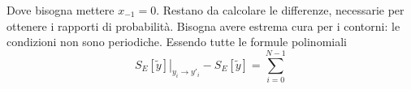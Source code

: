 \documentclass[italian]{article}
\begin{document}
	Dove bisogna mettere $x_{-1} = 0$. Restano da calcolare le differenze, necessarie per ottenere i rapporti di probabilità. Bisogna avere estrema cura per i contorni: le condizioni non sono periodiche. Essendo tutte le formule polinomiali
	\begin{equation}
		\left.S_E[\tilde{y}]\right|_{y_i \to y'_i} - S_E[\tilde{y}] =
		 \sum_{i=0}^{N-1} 
	\end{equation}
	
\end{document}
